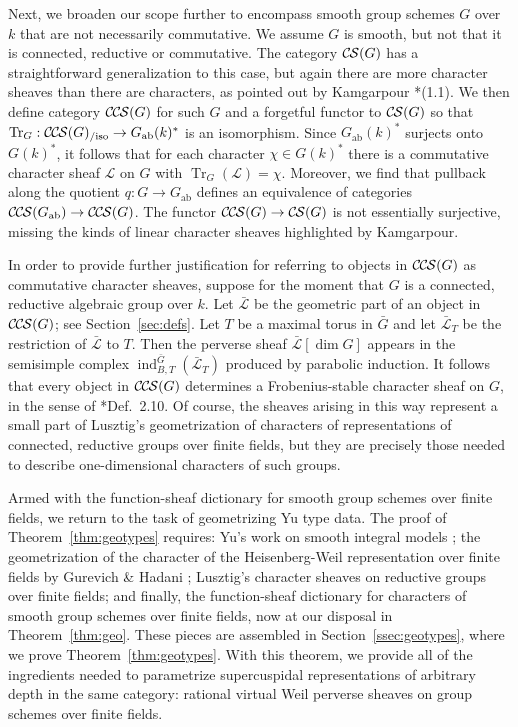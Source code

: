 \documentclass[10pt]{amsart}
\theoremstyle{plain}
\theoremstyle{definition}
\newcommand{\Fq}{k}
\newcommand{\ab}{_{\operatorname{ab}}}
\DeclareMathOperator{\Tr}{Tr}
\newcommand{\TrFrob}[1]{\Tr_{#1}}
\newcommand{\cs}[1]{{\mathcal{#1}}}
\newcommand{\gcs}[1]{{\mathcal{\bar #1}}}
\newcommand{\CS}{{\mathcal{C\hskip-0.8pt S}}}
\newcommand{\CCS}{{\mathcal{C\hskip-.8pt C\hskip-0.8pt S}}}
\newcommand{\CCSiso}[1]{\CCS(#1)_{/\text{iso}}}
\newcommand{\bG}{\bar{G}}
\begin{document}
Next, we broaden our scope further to encompass smooth group schemes $G$ over $\Fq$ that are not necessarily commutative.
We assume $G$ is smooth, but not that it is connected, reductive or commutative. 
The category $\CS(G)$ has a straightforward generalization to this case, but again
there are more character sheaves than there are characters, as pointed out by Kamgarpour \cite{kamgarpour:09a}*{(1.1)}.
We then define category $\CCS(G)$ for such $G$ and a forgetful functor to $\CS(G)$ so that $\TrFrob{G} : \CCSiso{G} \to G\ab(k)^*$
is an isomorphism.  
Since $G\ab(k)^*$ surjects onto $G(k)^*$, it follows that for each character $\chi \in G(k)^*$ there is a commutative
character sheaf $\cs{L}$ on $G$ with $\TrFrob{G}(\cs{L}) = \chi$. Moreover, we find that pullback along the quotient $q : G \to G\ab$
defines an equivalence of categories $\CCS(G\ab) \to \CCS(G)$.  
The functor $\CCS(G) \to \CS(G)$ is not
essentially surjective, missing the kinds of linear character sheaves highlighted by Kamgarpour.

In order to provide further justification for referring to objects in $\CCS(G)$ as commutative character sheaves, suppose for the moment that $G$ is a connected, reductive algebraic group over $\Fq$.
Let $\gcs{L}$ be the geometric part of an object in $\CCS(G)$; see Section~\ref{sec:defs}.
Let $T$ be a maximal torus in $\bG$ and let $\gcs{L}_T$ be the restriction of $\gcs{L}$ to $T$.
Then the perverse sheaf $\gcs{L}[\dim G]$ appears in the semisimple complex $\operatorname{ind}_{B,T}^{\bG}(\gcs{L}_T)$ produced by parabolic induction.
It follows that every object in $\CCS(G)$ determines a Frobenius-stable character sheaf on $G$, in the sense of \cite{lusztig:85a}*{Def.~2.10}.
Of course, the sheaves arising in this way represent a small part of Lusztig's geometrization of characters of representations of connected, reductive groups over finite fields, but they are precisely those needed to describe one-dimensional characters of such groups. 

Armed with the function-sheaf dictionary for smooth group schemes over finite fields, we return to the task of geometrizing Yu type data. 
The proof of Theorem~\ref{thm:geotypes} requires: Yu's work on smooth integral models \cite{Yu:models}; the geometrization of the character of the Heisenberg-Weil representation over finite fields by Gurevich \& Hadani \cite{gurevich-hadani:07a}; Lusztig's character sheaves on reductive groups over finite fields; and finally, the function-sheaf dictionary for characters of smooth group schemes over finite fields, now at our disposal in Theorem~\ref{thm:geo}.
These pieces are assembled in Section~\ref{ssec:geotypes}, where we prove Theorem~\ref{thm:geotypes}.
With this theorem, we provide all of the ingredients needed to parametrize supercuspidal representations of arbitrary depth in the same category: rational virtual Weil perverse sheaves on group schemes over finite fields. 
 
\end{document}
